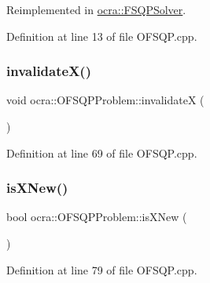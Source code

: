 Reimplemented in \hyperlink{classocra_1_1FSQPSolver_ac88cddc691c4bf9862f9d6f30599a098}{ocra\+::\+F\+S\+Q\+P\+Solver}.



Definition at line 13 of file O\+F\+S\+Q\+P.\+cpp.

\hypertarget{classocra_1_1OFSQPProblem_a65096824ee00c0254cfeee877dba0141}{}\label{classocra_1_1OFSQPProblem_a65096824ee00c0254cfeee877dba0141} 
\subsubsection{\texorpdfstring{invalidate\+X()}{invalidateX()}}
{\footnotesize\ttfamily void ocra\+::\+O\+F\+S\+Q\+P\+Problem\+::invalidateX (\begin{DoxyParamCaption}{ }\end{DoxyParamCaption})}



Definition at line 69 of file O\+F\+S\+Q\+P.\+cpp.

\hypertarget{classocra_1_1OFSQPProblem_a3c43fbd5d2ef3aeb9c6d936c83d34464}{}\label{classocra_1_1OFSQPProblem_a3c43fbd5d2ef3aeb9c6d936c83d34464} 
\subsubsection{\texorpdfstring{is\+X\+New()}{isXNew()}}
{\footnotesize\ttfamily bool ocra\+::\+O\+F\+S\+Q\+P\+Problem\+::is\+X\+New (\begin{DoxyParamCaption}{ }\end{DoxyParamCaption})}



Definition at line 79 of file O\+F\+S\+Q\+P.\+cpp.

\hypertarget{classocra_1_1OFSQPProblem_adca0c224eb1b9f6e0c2d17f07277a899}{}\label{classocra_1_1OFSQPProblem_adca0c224eb1b9f6e0c2d17f07277a899} 
